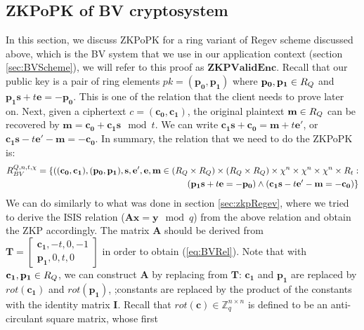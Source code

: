 \subsection{ZKPoPK of BV cryptosystem}
\label{sec:ZKPBV}
In this section, we discuss ZKPoPK for a ring variant of Regev scheme discussed above, which is the BV system that we use in
our application context (section \ref{sec:BVScheme}), we will refer to this
proof as $\mathbf{ZKPValidEnc}$. Recall that our public key is a pair of ring elements $pk = (\mathbf{p_0},
\mathbf{p_1})$ where $\mathbf{p_0}, \mathbf{p_1} \in R_Q$ and $\mathbf{p_1}\mathbf{s}+ t\mathbf{e} = -\mathbf{p_0} $. This
is one of the relation that the client needs to prove later on. Next, given a ciphertext $c = (\mathbf{c_0}, \mathbf{c_1})$, the original
plaintext $\mathbf{m} \in R_Q$ can be recovered by $\mathbf{m} = \mathbf{c_0} + \mathbf{c_1}\mathbf{s} \mod t$. We can
write $\mathbf{c_1}\mathbf{s} + \mathbf{c_0} = \mathbf{m} + t\mathbf{e'}$, or $\mathbf{c_1}\mathbf{s} -t\mathbf{e'} -\mathbf{m} = -\mathbf{c_0}$.
In summary, the relation that we need to do the ZKPoPK is:
\begin{align}
  \label{eq:BVRel}
  R_{BV}^{Q,n,t,\chi} = \{((\mathbf{c_0}, \mathbf{c_1}),(\mathbf{p_0}, \mathbf{p_1}), \mathbf{s},\mathbf{e'}, \mathbf{e}, \mathbf{m} \in
  (R_Q \times R_Q) \times (R_Q \times R_Q)  \times \chi^n \times \chi^n \times \chi^n \times R_t:\\ \nonumber
  (\mathbf{p_1}\mathbf{s} + t\mathbf{e} = -\mathbf{p_0} ) \land (\mathbf{c_1}\mathbf{s} - t\mathbf{e'} -\mathbf{m} = -\mathbf{c_0})
  \}
\end{align}
We can do similarly to what was done in section \ref{sec:zkpRegev}, where we tried to derive the ISIS relation ($\mathbf{A}\mathbf{x} = \mathbf{y} \mod q$)
from the above relation and obtain the ZKP accordingly.
The matrix $\mathbf{A}$ should be derived from $\mathbf{T}= \begin{bmatrix}
  \mathbf{c_1}, -t, 0, -1\\ \mathbf{p_1}, 0, t, 0
\end{bmatrix}$ in order to obtain (\ref{eq:BVRel}). Note that with $\mathbf{c_1},\mathbf{p_1} \in R_Q$, we can construct $\mathbf{A}$ by
replacing from $\mathbf{T}$: $\mathbf{c_1}$ and $\mathbf{p_1}$ are replaced by $rot(\mathbf{c_1})$ and $rot(\mathbf{p_1})$,
;constants
are replaced by the product of the constants with the identity matrix $\mathbf{I}$. Recall that $ rot({\textbf{c}}) \in
\mathbb{Z}_q^{n\times n}$ is defined to be an anti-circulant
square matrix, whose first
